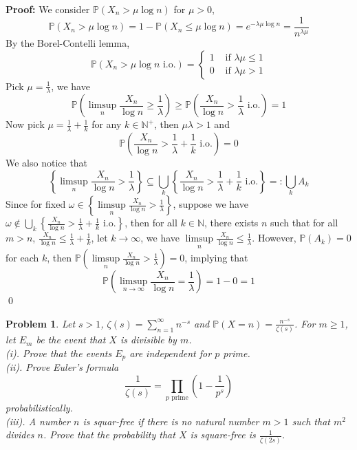 \documentclass[12pt]{article}
\newtheorem{problem}{Problem}
\begin{document}
\textbf{Proof:} We consider $\mathbb{P}(X_n>\mu\log n)$ for $\mu>0$, 
$$
    \mathbb{P}(X_n>\mu\log n)=1-\mathbb{P}(X_n\leq\mu\log n)=e^{-\lambda\mu\log n}=\frac{1}{n^{\lambda\mu}}
$$
By the Borel-Contelli lemma, 
$$
    \mathbb{P}(X_n>\mu\log n\text{ i.o.})= \begin{cases}
  1& \text{ if } \lambda\mu\leq 1\\
  0& \text{ if } \lambda\mu>1
\end{cases}
$$ 
Pick $\mu=\frac{1}{\lambda}$, we have 
$$
    \mathbb{P}\left(\limsup_n\frac{X_n}{\log n}\geq \frac{1}{\lambda}\right)\geq \mathbb{P}\left(\frac{X_n}{\log n}>\frac{1}{\lambda}\text{ i.o.}\right)=1
$$
Now pick $\mu=\frac{1}{\lambda}+\frac{1}{k}$ for any $k\in\mathbb{N}^+$, then $\mu\lambda>1$ and 
$$
    \mathbb{P}\left(\frac{X_n}{\log n}>\frac{1}{\lambda}+\frac{1}{k}\text{ i.o.}\right)=0
$$
We also notice that 
$$
    \left\{\limsup_n\frac{X_n}{\log n}>\frac{1}{\lambda}\right\}\subseteq\bigcup_k\left\{\frac{X_n}{\log n}>\frac{1}{\lambda}+\frac{1}{k}\text{ i.o.}\right\}=:\bigcup_k A_k
$$
Since for fixed $\omega\in \left\{\limsup\limits_n\frac{X_n}{\log n}>\frac{1}{\lambda}\right\}$, suppose we have $\omega\notin\bigcup_k\left\{\frac{X_n}{\log n}>\frac{1}{\lambda}+\frac{1}{k}\text{ i.o.}\right\}$, then for all $k\in\mathbb{N}$, there exists $n$ such that for all $m> n$, $\frac{X_n}{\log n}\leq \frac{1}{\lambda}+\frac{1}{k}$, let $k\to\infty$, we have $\limsup\limits_n\frac{X_n}{\log n}\leq \frac{1}{\lambda}$. However, $\mathbb{P}(A_k)=0$ for each $k$, then $\mathbb{P}\left(\limsup\limits_{n}\frac{X_n}{\log n}>\frac{1}{\lambda}\right)=0$, implying that 
$$
    \mathbb{P}\left(\limsup_{n\to\infty}\frac{X_n}{\log n}=\frac{1}{\lambda}\right)=1-0=1
$$
\qed
\\
\begin{problem}
    Let $s>1$, $\zeta(s)=\sum\limits_{n=1}^\infty n^{-s}$ and $\mathbb{P}(X=n)=\frac{n^{-s}}{\zeta(s)}$. For $m\geq 1$, let $E_m$ be the event that $X$ is divisible by $m$. \\
    \indent (i). Prove that the events $E_p$ are independent for $p$ prime. \\
    \indent (ii). Prove Euler's formula
    $$
        \frac{1}{\zeta(s)}=\prod_{p\text{ prime}}\left(1-\frac{1}{p^s}\right)
    $$
    probabilistically. \\
    \indent (iii). A number $n$ is squar-free if there is no natural number $m>1$ such that $m^2$ divides $n$. Prove that the probability that $X$ is square-free is $\frac{1}{\zeta(2s)}$.
\end{problem}
\end{document}
